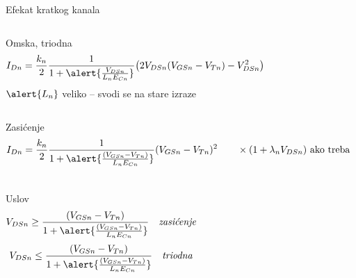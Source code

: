 \begin{frame}[label=09_1-s006]{Efekat kratkog kanala}\setlength{\parskip}{2pt}\setlength{\abovedisplayskip}{4pt}\setlength{\belowdisplayskip}{4pt}\setlength{\abovedisplayshortskip}{3pt}\setlength{\belowdisplayshortskip}{3pt}
\begin{columns}[c,onlytextwidth]Omska, triodna
\[I_{Dn}=\frac{k_n}{2}\frac1{1+\alert{\frac{V_{DSn}}{L_nE_{Cn}}}}\bigl(2V_{DSn}(V_{GSn}-V_{Tn})-V_{DSn}^2\bigr)\]
\hfill $\alert{L_n}$ veliko – svodi se na stare izraze
\end{columns}\medskip
\begin{columns}[c,onlytextwidth]Zasićenje
\[I_{Dn}=\frac{k_n}{2}\frac1{1+\alert{\frac{(V_{GSn}-V_{Tn})}{L_nE_{Cn}}}}(V_{GSn}-V_{Tn})^2\qquad\times(1+\lambda_nV_{DSn})\ \text{ako treba}\]
\end{columns}\medskip
\begin{columns}[c,onlytextwidth]Uslov
\[V_{DSn}\geq\frac{(V_{GSn}-V_{Tn})}{1+\alert{\frac{(V_{GSn}-V_{Tn})}{L_nE_{Cn}}}}\quad\textit{zasićenje}\]
\[V_{DSn}\leq\frac{(V_{GSn}-V_{Tn})}{1+\alert{\frac{(V_{GSn}-V_{Tn})}{L_nE_{Cn}}}}\quad\textit{triodna}\]
\end{columns}
\end{frame}
